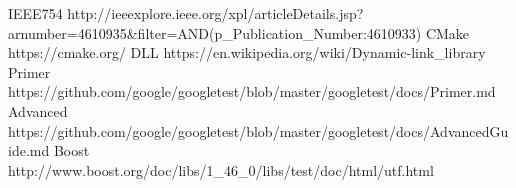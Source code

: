 \documentclass[12pt,a4paper,notitlepage]{report}
\begin{document}
	
	
	\begin{thebibliography}{1}
		IEEE754 http://ieeexplore.ieee.org/xpl/articleDetails.jsp?arnumber=4610935&filter=AND(p_Publication_Number:4610933)
		CMake https://cmake.org/
		DLL https://en.wikipedia.org/wiki/Dynamic-link_library
	  	Primer https://github.com/google/googletest/blob/master/googletest/docs/Primer.md
	  	Advanced https://github.com/google/googletest/blob/master/googletest/docs/AdvancedGuide.md
	  	Boost http://www.boost.org/doc/libs/1_46_0/libs/test/doc/html/utf.html

	 \end{thebibliography}
\end{document}
